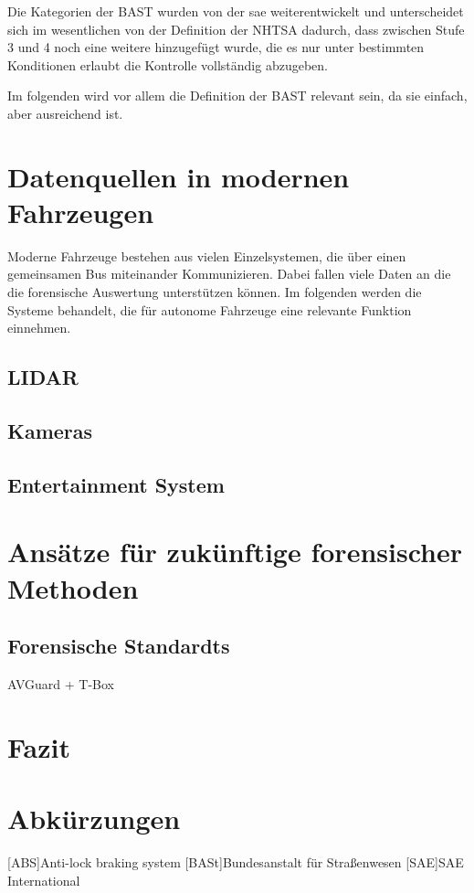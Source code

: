 \documentclass[conference,compsoc,final,a4paper]{IEEEtran}
\begin{document}
Die Kategorien der \ac{BAST} wurden von der \ac{sae} weiterentwickelt \cite{bast2021} und unterscheidet sich im wesentlichen von der Definition der \ac{NHTSA} dadurch, dass zwischen Stufe 3 und 4 noch eine weitere hinzugefügt wurde, die es nur unter bestimmten Konditionen erlaubt die Kontrolle vollständig abzugeben\cite{SAE2021}.

Im folgenden wird vor allem die Definition der \ac{BAST} relevant sein, da sie einfach, aber ausreichend ist.

\section{Datenquellen in modernen Fahrzeugen}

Moderne Fahrzeuge bestehen aus vielen Einzelsystemen, die über einen gemeinsamen Bus miteinander Kommunizieren.
Dabei fallen viele Daten an die die forensische Auswertung unterstützen können. Im folgenden werden die Systeme behandelt,
die für autonome Fahrzeuge eine relevante Funktion einnehmen.

\subsection{LIDAR}
\subsection{Kameras}
\subsection{Entertainment System}

\section{Ansätze für zukünftige forensischer Methoden}
\subsection{Forensische Standardts}

AVGuard + T-Box

\section{Fazit}
\section*{Abkürzungen}

\begin{acronym}[IEEE]
  [ABS]{Anti-lock braking system}
  [BASt]{Bundesanstalt für Straßenwesen}
  [SAE]{SAE International}
\end{acronym}

\printbibliography
\end{document}
